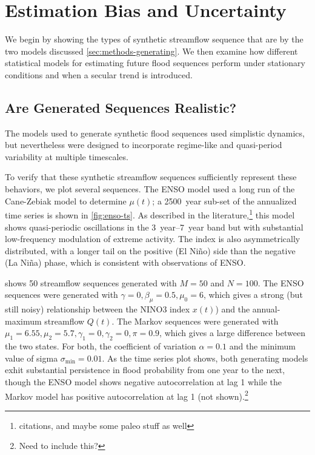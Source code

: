 \documentclass[12pt]{article}
\begin{document}
\section{Estimation Bias and Uncertainty}\label{sec:results}

We begin by showing the types of synthetic streamflow sequence that are by the two models discussed \cref{sec:methods-generating}.
We then examine how different statistical models for estimating future flood sequences perform under stationary conditions and when a secular trend is introduced.

\subsection{Are Generated Sequences Realistic?\label{sec:sequence-realistic}}

The models used to generate synthetic flood sequences used simplistic dynamics, but nevertheless were designed to incorporate regime-like and quasi-period variability at multiple timescales.

To verify that these synthetic streamflow sequences sufficiently represent these behaviors, we plot several sequences.
The ENSO model used a long run of the Cane-Zebiak model \citep{Zebiak1987,Ramesh2017} to determine \(\mu(t)\); a \SI{2500}{year} sub-set of the annualized time series is shown in \cref{fig:enso-ts}.
As described in the literature,\footnote{citations, and maybe some paleo stuff as well} this model shows quasi-periodic oscillations in the \SIrange{3}{7}{year} band but with substantial low-frequency modulation of extreme activity.
The index is also asymmetrically distributed, with a longer tail on the positive (El Ni\~{n}o) side than the negative (La Ni\~{n}a) phase, which is consistent with observations of ENSO.

 shows 50 streamflow sequences generated with \(M=50\) and \(N=100\).
The ENSO sequences were generated with \(\gamma=0, \beta_\mu=0.5, \mu_0=6\), which gives a strong (but still noisy) relationship between the NINO3 index \(x(t)\)) and the annual-maximum streamflow \(Q(t)\).
The Markov sequences were generated with \(\mu_1 = 6.55, \mu_2=5.7, \gamma_1=0, \gamma_2=0, \pi=0.9\), which gives a large difference between the two states.
For both, the coefficient of variation \(\alpha=0.1\) and the minimum value of sigma \(\sigma_\text{min}=0.01\).
As the time series plot shows, both generating models exhit substantial persistence in flood probability from one year to the next, though the ENSO model shows negative autocorrelation at lag 1 while the Markov model has positive autocorrelation at lag 1 (not shown).\footnote{Need to include this?}
\end{document}
